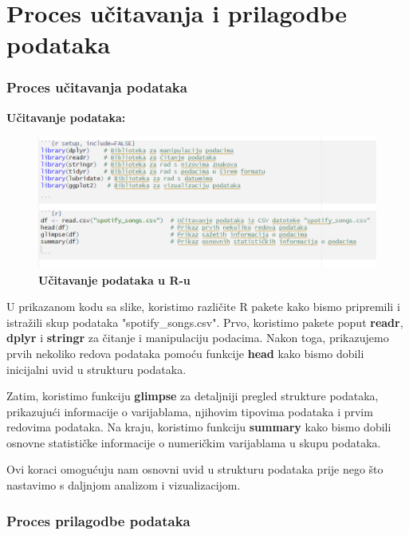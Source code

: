 \section{Proces učitavanja i prilagodbe podataka}

	\subsubsection{Proces učitavanja podataka}
	
		\textbf{Učitavanje podataka:}
		\begin{figure}[H]
			\centering
			\includegraphics[scale=0.9]{slike/ucitavanje.png}
			\caption{\textbf{Učitavanje podataka u R-u}}
		\end{figure}
		
		U prikazanom kodu sa slike, koristimo različite R pakete kako bismo pripremili i istražili skup podataka "spotify\_songs.csv". Prvo, koristimo pakete poput \textbf{readr}, \textbf{dplyr} i \textbf{stringr} za čitanje i manipulaciju podacima. Nakon toga, prikazujemo prvih nekoliko redova podataka pomoću funkcije \textbf{head} kako bismo dobili inicijalni uvid u strukturu podataka.
		
		Zatim, koristimo funkciju \textbf{glimpse} za detaljniji pregled strukture podataka, prikazujući informacije o varijablama, njihovim tipovima podataka i prvim redovima podataka. Na kraju, koristimo funkciju \textbf{summary} kako bismo dobili osnovne statističke informacije o numeričkim varijablama u skupu podataka.
		
		Ovi koraci omogućuju nam osnovni uvid u strukturu podataka prije nego što nastavimo s daljnjom analizom i vizualizacijom.

	
	\subsubsection{Proces prilagodbe podataka}
	



